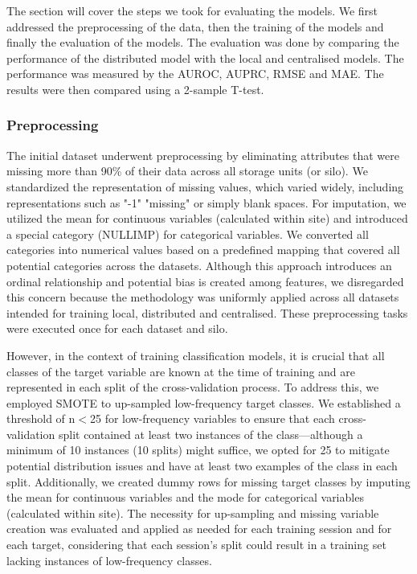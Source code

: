 
The section will cover the steps we took for evaluating the models. We first addressed the preprocessing of the data, then the training of the models and finally the evaluation of the models. The evaluation was done by comparing the performance of the distributed model with the local and centralised models. The performance was measured by the AUROC, AUPRC, RMSE and MAE. The results were then compared using a 2-sample T-test.
\subsubsection{Preprocessing}

The initial dataset underwent preprocessing by eliminating attributes that were missing more than 90\% of their data across all storage units (or silo). We standardized the representation of missing values, which varied widely, including representations such as "-1" "missing" or simply blank spaces. For imputation, we utilized the mean for continuous variables (calculated within site) and introduced a special category (NULLIMP) for categorical variables. We converted all categories into numerical values based on a predefined mapping that covered all potential categories across the datasets. Although this approach introduces an ordinal relationship and potential bias is created among features, we disregarded this concern because the methodology was uniformly applied across all datasets intended for training local, distributed and centralised. These preprocessing tasks were executed once for each dataset and silo.

However, in the context of training classification models, it is crucial that all classes of the target variable are known at the time of training and are represented in each split of the cross-validation process. To address this, we employed SMOTE \cite{smote} to up-sampled low-frequency target classes. We established a threshold of n$<$25 for low-frequency variables to ensure that each cross-validation split contained at least two instances of the class—although a minimum of 10 instances (10 splits) might suffice, we opted for 25 to mitigate potential distribution issues and have at least two examples of the class in each split. Additionally, we created dummy rows for missing target classes by imputing the mean for continuous variables and the mode for categorical variables (calculated within site). The necessity for up-sampling and missing variable creation was evaluated and applied as needed for each training session and for each target, considering that each session's split could result in a training set lacking instances of low-frequency classes.

